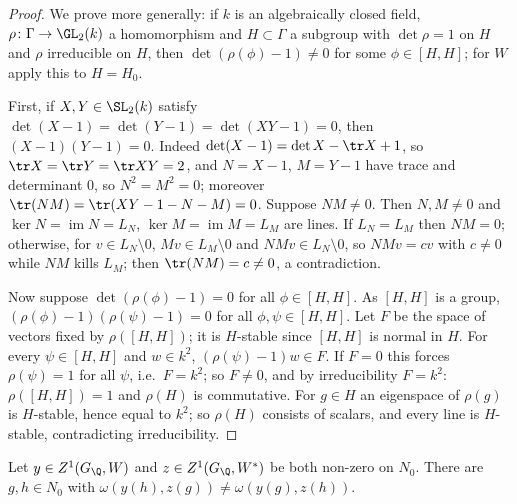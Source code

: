 \begin{proof}
We prove more generally: if $k$ is an algebraically closed field, $\rho\colon\Gamma\to\GL_2(k)$ a homomorphism and $H\subset\Gamma$
a subgroup with $\det\rho=1$ on $H$ and $\rho$ irreducible on $H$, then $\det(\rho(\phi)-1)\ne0$ for some $\phi\in[H,H]$; for $W$
apply this to $H=H_0$.

First, if $X,Y\in\SL_2(k)$ satisfy $\det(X-1)=\det(Y-1)=\det(XY-1)=0$, then $(X-1)(Y-1)=0$. Indeed $\det(X-1)=\det X-\tr X+1$,
so $\tr X=\tr Y=\tr XY=2$, and $N=X-1$, $M=Y-1$ have trace and determinant $0$, so $N^2=M^2=0$; moreover
$\tr(NM)=\tr(XY-1-N-M)=0$. Suppose $NM\ne0$. Then $N,M\ne0$ and $\ker N=\operatorname{im}N=L_N$, $\ker M=\operatorname{im}M=L_M$ are lines. If
$L_N=L_M$ then $NM=0$; otherwise, for $v\in L_N\setminus0$, $Mv\in L_M\setminus0$ and $NMv\in L_N\setminus0$, so $NMv=cv$
with $c\ne0$ while $NM$ kills $L_M$; then $\tr(NM)=c\ne0$, a contradiction.

Now suppose $\det(\rho(\phi)-1)=0$ for all $\phi\in[H,H]$. As $[H,H]$ is a group, $(\rho(\phi)-1)(\rho(\psi)-1)=0$ for all
$\phi,\psi\in[H,H]$. Let $F$ be the space of vectors fixed by $\rho([H,H])$; it is $H$-stable since $[H,H]$ is normal in $H$. For
every $\psi\in[H,H]$ and $w\in k^2$, $(\rho(\psi)-1)w\in F$. If $F=0$ this forces $\rho(\psi)=1$ for all $\psi$, i.e.\ $F=k^2$; so
$F\ne0$, and by irreducibility $F=k^2$: $\rho([H,H])=1$ and $\rho(H)$ is commutative. For $g\in H$ an eigenspace of $\rho(g)$ is
$H$-stable, hence equal to $k^2$; so $\rho(H)$ consists of scalars, and every line is $H$-stable, contradicting
irreducibility.
\end{proof}

\begin{lemma}\label{pf:kato:pair}
Let $y\in\katoZ(G_\Q,W)$ and $z\in\katoZ(G_\Q,W^*)$ be both non-zero on $N_0$. There are $g,h\in N_0$ with
$\omega(y(h),z(g))\ne\omega(y(g),z(h))$.
\end{lemma}

